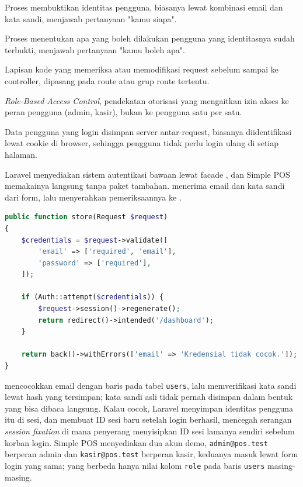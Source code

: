 \begin{istilahpenting}
\begin{description}[leftmargin=0pt,style=nextline]
  \item[Autentikasi] Proses membuktikan identitas pengguna, biasanya lewat kombinasi email dan kata sandi, menjawab pertanyaan "kamu siapa".
  \item[Otorisasi] Proses menentukan apa yang boleh dilakukan pengguna yang identitasnya sudah terbukti, menjawab pertanyaan "kamu boleh apa".
  \item[Middleware] Lapisan kode yang memeriksa atau memodifikasi request sebelum sampai ke controller, dipasang pada route atau grup route tertentu.
  \item[RBAC] \textit{Role-Based Access Control}, pendekatan otorisasi yang mengaitkan izin akses ke peran pengguna (admin, kasir), bukan ke pengguna satu per satu.
  \item[Sesi] Data pengguna yang login disimpan server antar-request, biasanya diidentifikasi lewat cookie di browser, sehingga pengguna tidak perlu login ulang di setiap halaman.
\end{description}
\end{istilahpenting}

Laravel menyediakan sistem autentikasi bawaan lewat facade
, dan Simple POS memakainya langsung tanpa paket
tambahan.  menerima email dan kata sandi dari
form, lalu menyerahkan pemeriksaannya ke
.

\begin{lstlisting}[language=php, title=\lstfile{app/Http/Controllers/Auth/LoginController.php}]
public function store(Request $request)
{
    $credentials = $request->validate([
        'email' => ['required', 'email'],
        'password' => ['required'],
    ]);

    if (Auth::attempt($credentials)) {
        $request->session()->regenerate();
        return redirect()->intended('/dashboard');
    }

    return back()->withErrors(['email' => 'Kredensial tidak cocok.']);
}
\end{lstlisting}

 mencocokkan email dengan baris pada tabel
\texttt{users}, lalu memverifikasi kata sandi lewat hash yang tersimpan;
kata sandi asli tidak pernah disimpan dalam bentuk yang bisa dibaca
langsung. Kalau cocok, Laravel menyimpan identitas pengguna itu di sesi,
dan  membuat ID sesi baru
setelah login berhasil, mencegah serangan
\textit{session fixation} di mana penyerang menyisipkan ID sesi lamanya
sendiri sebelum korban login. Simple POS menyediakan dua akun demo,
\texttt{admin@pos.test} berperan admin dan \texttt{kasir@pos.test}
berperan kasir, keduanya masuk lewat form login yang sama; yang berbeda
hanya nilai kolom \texttt{role} pada baris \texttt{users} masing-masing.

